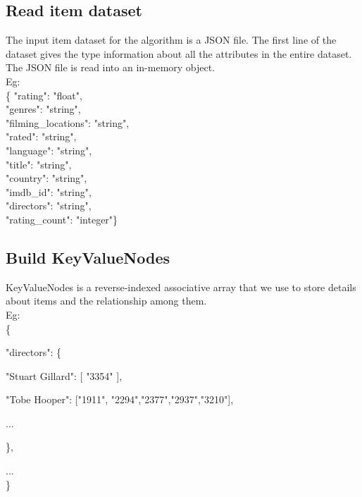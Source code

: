\documentclass[11pt]{article}
\begin{document}
\subsection{Read item dataset}
The input item dataset for the algorithm is a JSON file. The first line of the dataset gives the type information about all the attributes in the entire dataset. The JSON file is read into an in-memory object.\\

Eg:\\
\{
"rating": "float", \\
"genres": "string", \\
"filming\_locations": "string", \\
"rated": "string", \\
"language": "string", \\
"title": "string", \\
"country": "string", \\
"imdb\_id": "string", \\
"directors": "string", \\
"rating\_count": "integer"\}


\subsection{Build KeyValueNodes}
KeyValueNodes is a reverse-indexed associative array that we use to store details about items and the relationship among them.\\
Eg:\\
\{  

"directors": \{

\hspace{26 mm} "Stuart Gillard": [ "3354" ],

\hspace{26 mm} "Tobe Hooper": ["1911", "2294","2377","2937","3210"],

\hspace{26 mm} ...

\hspace{20 mm} \},

...
\\
\}
\end{document}
